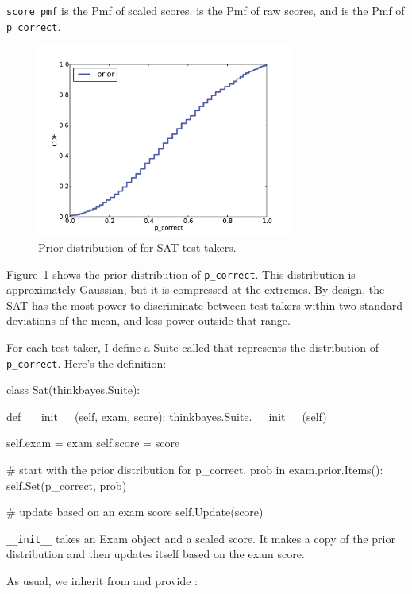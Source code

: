 \documentclass[12pt]{book}
\theoremstyle{exercise}
\begin{document}
\verb"score_pmf" is the Pmf of
scaled scores.    is the Pmf of raw scores, and
 is the Pmf of \verb"p_correct".

\begin{figure}
\centerline{\includegraphics[height=2.5in]{figs/sat_prior.pdf}}
\caption{Prior distribution of  for SAT test-takers.}
\label{fig.satprior}
\end{figure}

Figure~\ref{fig.satprior} shows the prior distribution of
\verb"p_correct".  This distribution is approximately Gaussian, but it
is compressed at the extremes.  By design, the SAT has the most power
to discriminate between test-takers within two standard deviations of
the mean, and less power outside that range.

For each test-taker, I define a Suite called  that
represents the distribution of \verb"p_correct".  Here's the definition:

\begin{code}
class Sat(thinkbayes.Suite):

    def __init__(self, exam, score):
        thinkbayes.Suite.__init__(self)

        self.exam = exam
        self.score = score

        # start with the prior distribution
        for p_correct, prob in exam.prior.Items():
            self.Set(p_correct, prob)

        # update based on an exam score
        self.Update(score)
\end{code}

\verb"__init__" takes an Exam object and a scaled score.  It makes a
copy of the prior distribution and then updates itself based on the
exam score.

As usual, we inherit  from  and provide
:
\end{document}
